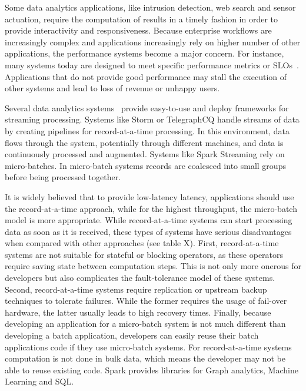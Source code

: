 Some data analytics applications, like intrusion detection, web search and sensor actuation, require the computation of results in a timely fashion in order to provide interactivity and responsiveness. 
Because enterprise workflows are increasingly complex and applications increasingly rely on higher number of other applications, the performance systems become a major concern.
For instance, many systems today are designed to meet specific performance metrics or SLOs~\cite{Jockey}.
Applications that do not provide good performance may stall the execution of other systems and lead to loss of revenue or unhappy users.

Several data analytics 
systems~\cite{Babu:2001:CQO:603867.603884,TelegraphCQ,Storm,SparkStreaming,Trill,Naiad,Niagara,StreamInsight,Carney:2002:MSN:1287369.1287389,Sullivan:1998:TSM:1268256.1268258,condie2010mapreduce,Brito:2011:SLD:2114498.2116192} 
provide easy-to-use and deploy frameworks for streaming processing.
Systems like Storm or TelegraphCQ handle streams of data by creating pipelines for record-at-a-time processing. In this environment, data flows through the system, potentially through different machines, and data is continuously processed and augmented.
Systems like Spark Streaming rely on micro-batches. In micro-batch systems records are coalesced into small groups before being processed together.

It is widely believed that to provide low-latency latency, applications should use the record-at-a-time approach, while for the highest throughput, the micro-batch model is more appropriate. 
While record-at-a-time systems can start processing data as soon as it is received, these types of systems have serious disadvantages when compared with other approaches (see table X).
First, record-at-a-time systems are not suitable for stateful or blocking operators, as these operators require saving state between computation steps. This is not only more onerous for developers but also complicates the fault-tolerance model of these systems.
Second, record-at-a-time systems require replication or upstream backup techniques to tolerate failures.
While the former requires the usage of fail-over hardware, the latter usually leads to high recovery times.
Finally, because developing an application for a micro-batch system is not much different than developing a batch application, developers can easily reuse their batch applications code if they use micro-batch systems. For record-at-a-time systems computation is not done in bulk data, which means the developer may not be able to reuse existing code.
Spark provides libraries for Graph analytics, Machine Learning and SQL.

